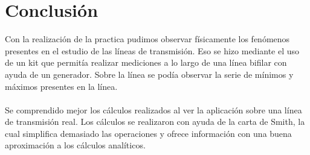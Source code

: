 \documentclass[12pt,letterpaper]{article}
\begin{document}
\section{Conclusión}
Con la realización de la practica pudimos observar físicamente los fenómenos presentes en el estudio de las líneas de transmisión. Eso se hizo mediante el uso de un kit que permitía realizar mediciones a lo largo de una línea bifilar con ayuda de un generador. Sobre la línea se podía observar la serie de mínimos y máximos presentes en la línea. 
\\ \\
Se comprendido mejor los cálculos realizados al ver la aplicación sobre una línea de transmisión real. Los cálculos se realizaron con ayuda de la carta de Smith, la cual simplifica demasiado las operaciones y ofrece información con una buena aproximación a los cálculos analíticos. 
\end{document}
